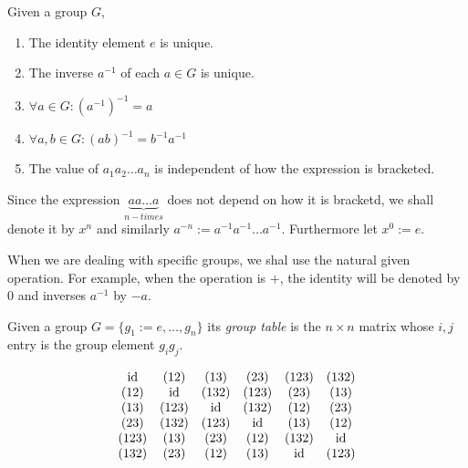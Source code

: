 \begin{proposition}
   Given a group \(G\),
   \begin{enumerate}[label=\roman*, align=Center]
      \item The identity element \(e\) is unique.
      \item The inverse \(a^{-1}\) of each \(a \in G\) is unique.
      \item \(\forall a \in G: (a^{-1})^{-1} = a\)
      \item \(\forall a, b \in G: (ab)^{-1} = b^{-1}a^{-1}\)
      \item The value of \(a_1a_2\ldots a_n\) is independent of how the expression is bracketed.
   \end{enumerate}
\end{proposition}
\begin{remark}[Notation]
   Since the expression \(\underbrace{a a \ldots a}_{n-times}\) does not depend on how it is bracketd, we shall denote it by \(x^n\) and similarly \(a^{-n} := a^{-1} a^{-1} \ldots a^{-1}\).
   Furthermore let \(x^0 := e\).

   When we are dealing with specific groups, we shal use the natural given operation.
   For example, when the operation is \(+\), the identity will be denoted by 0 and inverses \(a^{-1}\) by \(-a\).
\end{remark}

\begin{definition}
   Given a group \(G = \{g_1 := e, \ldots, g_n\}\) its \emph{group table} is the \(n \times n\) matrix whose \(i,j\) entry is the group element \(g_ig_j\).
\end{definition}
\begin{example}
   \[\begin{matrix}
         \operatorname{id}  & (12)  & (13)  & (23)  & (123) & (132) \\
         (12) & \operatorname{id}   & (132) & (123) & (23)  & (13)  \\
         (13) & (123) & \operatorname{id}   & (132) & (12)  & (23)  \\
         (23) & (132) & (123) & \operatorname{id}   & (13)  & (12)  \\
         (123) & (13) & (23) & (12)   & (132) & \operatorname{id}   \\
         (132) & (23) & (12) & (13)   & \operatorname{id}   & (123) \\
   \end{matrix}\]
\end{example}

